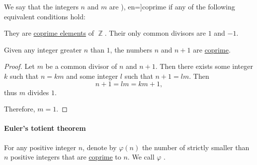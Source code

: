 \begin{definition}\label{def:coprime_numbers}
  We say that the integers \( n \) and \( m \) are \term[ru=взаимно простые (числа) (\cite[45]{Зорич2019АнализТом1}), en=]{coprime} if any of the following equivalent conditions hold:
  \begin{thmenum}
     They are \hyperref[def:coprime_elements]{coprime elements} of \( \BbbZ \).
     Their only common divisors are \( 1 \) and \( -1 \).
  \end{thmenum}
\end{definition}

\begin{proposition}\label{thm:n_plus_1_coprime}
  Given any integer greater \( n \) than \( 1 \), the numbers \( n \) and \( n + 1 \) are \hyperref[def:coprime_elements]{coprime}.
\end{proposition}
\begin{proof}
  Let \( m \) be a common divisor of \( n \) and \( n + 1 \). Then there exists some integer \( k \) such that \( n = km \) and some integer \( l \) such that \( n + 1 = lm \). Then
  \begin{equation*}
    n + 1 = lm = km + 1,
  \end{equation*}
  thus \( m \) divides \( 1 \).

  Therefore, \( m = 1 \).
\end{proof}

\paragraph{Euler's totient theorem}\hfill

\begin{definition}\label{def:eulers_totient_function}
  For any positive integer \( n \), denote by \( \varphi(n) \) the number of strictly smaller than \( n \) positive integers that are \hyperref[def:coprime_elements]{coprime} to \( n \). We call \( \varphi \) .
\end{definition}

